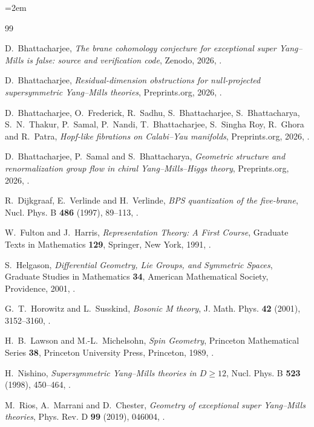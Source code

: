 \documentclass[11pt]{amsart}
\newcommand{\zenodoDOI}{10.5281/zenodo.24122696}
\theoremstyle{remark}
\begin{document}
\emergencystretch=2em
\begin{thebibliography}{99}
\raggedright

 D.~Bhattacharjee, \emph{The brane cohomology conjecture for exceptional super Yang--Mills is false: source and verification code}, Zenodo, 2026, \doi{\zenodoDOI}.

 D.~Bhattacharjee, \emph{Residual-dimension obstructions for null-projected supersymmetric Yang--Mills theories}, Preprints.org, 2026, .

 D.~Bhattacharjee, O.~Frederick, R.~Sadhu, S.~Bhattacharjee, S.~Bhattacharya, S.~N.~Thakur, P.~Samal, P.~Nandi, T.~Bhattacharjee, S.~Singha Roy, R.~Ghora and R.~Patra, \emph{Hopf-like fibrations on Calabi--Yau manifolds}, Preprints.org, 2026, .

 D.~Bhattacharjee, P.~Samal and S.~Bhattacharya, \emph{Geometric structure and renormalization group flow in chiral Yang--Mills--Higgs theory}, Preprints.org, 2026, .

 R.~Dijkgraaf, E.~Verlinde and H.~Verlinde, \emph{BPS quantization of the five-brane}, Nucl. Phys. B \textbf{486} (1997), 89--113, .

 W.~Fulton and J.~Harris, \emph{Representation Theory: A First Course}, Graduate Texts in Mathematics \textbf{129}, Springer, New York, 1991, .

 S.~Helgason, \emph{Differential Geometry, Lie Groups, and Symmetric Spaces}, Graduate Studies in Mathematics \textbf{34}, American Mathematical Society, Providence, 2001, .

 G.~T.~Horowitz and L.~Susskind, \emph{Bosonic M theory}, J. Math. Phys. \textbf{42} (2001), 3152--3160, .

 H.~B.~Lawson and M.-L.~Michelsohn, \emph{Spin Geometry}, Princeton Mathematical Series \textbf{38}, Princeton University Press, Princeton, 1989, .

 H.~Nishino, \emph{Supersymmetric Yang--Mills theories in $D\ge12$}, Nucl. Phys. B \textbf{523} (1998), 450--464, .

 M.~Rios, A.~Marrani and D.~Chester, \emph{Geometry of exceptional super Yang--Mills theories}, Phys. Rev. D \textbf{99} (2019), 046004, .


\end{thebibliography}
\end{document}
